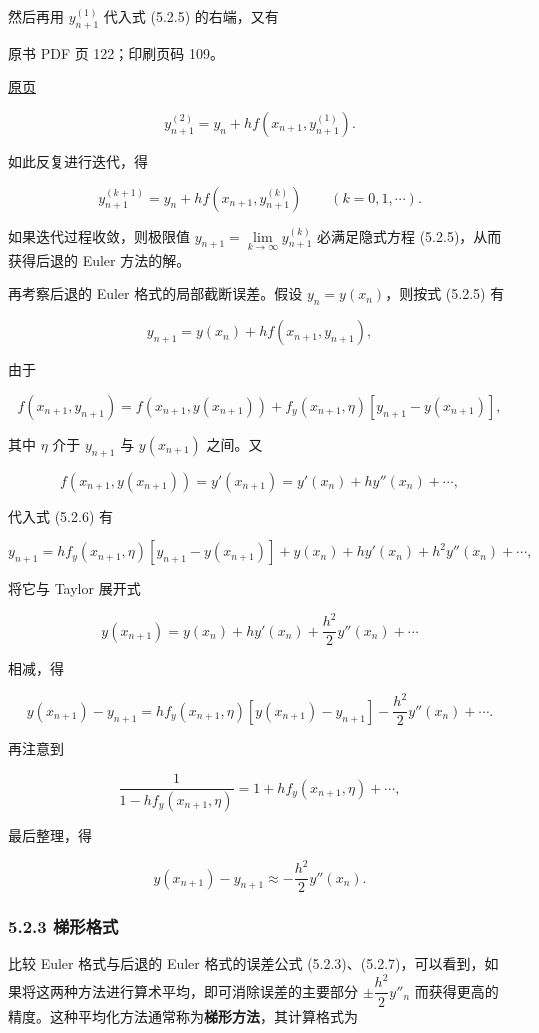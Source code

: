 然后再用 \(y_{n+1}^{(1)}\) 代入式 (5.2.5) 的右端，又有

\clearpage

原书 PDF 页 122；印刷页码 109。

\href{source-images/pdf-122.jpeg}{原页}

\[
y_{n+1}^{(2)}=y_n+hf(x_{n+1},y_{n+1}^{(1)}).
\]

如此反复进行迭代，得

\[
y_{n+1}^{(k+1)}=y_n+hf(x_{n+1},y_{n+1}^{(k)})\qquad(k=0,1,\cdots).
\]

如果迭代过程收敛，则极限值 \(y_{n+1}=\lim\limits_{k\to\infty}y_{n+1}^{(k)}\) 必满足隐式方程 (5.2.5)，从而获得后退的 Euler 方法的解。

再考察后退的 Euler 格式的局部截断误差。假设 \(y_n=y(x_n)\)，则按式 (5.2.5) 有

\[
y_{n+1}=y(x_n)+hf(x_{n+1},y_{n+1}),\tag{5.2.6}
\]

由于

\[
f(x_{n+1},y_{n+1})=f(x_{n+1},y(x_{n+1}))+f_y(x_{n+1},\eta)[y_{n+1}-y(x_{n+1})],
\]

其中 \(\eta\) 介于 \(y_{n+1}\) 与 \(y(x_{n+1})\) 之间。又

\[
f(x_{n+1},y(x_{n+1}))=y'(x_{n+1})=y'(x_n)+hy''(x_n)+\cdots,
\]

代入式 (5.2.6) 有

\[
y_{n+1}=hf_y(x_{n+1},\eta)[y_{n+1}-y(x_{n+1})]+y(x_n)+hy'(x_n)+h^2y''(x_n)+\cdots,
\]

将它与 Taylor 展开式

\[
y(x_{n+1})=y(x_n)+hy'(x_n)+\frac{h^2}{2}y''(x_n)+\cdots
\]

相减，得

\[
y(x_{n+1})-y_{n+1}=hf_y(x_{n+1},\eta)[y(x_{n+1})-y_{n+1}]-\frac{h^2}{2}y''(x_n)+\cdots.
\]

再注意到

\[
\frac{1}{1-hf_y(x_{n+1},\eta)}=1+hf_y(x_{n+1},\eta)+\cdots,
\]

最后整理，得

\[
y(x_{n+1})-y_{n+1}\approx-\frac{h^2}{2}y''(x_n).\tag{5.2.7}
\]

\subsubsection{5.2.3 梯形格式}\label{ch05a-ux68afux5f62ux683cux5f0f}

比较 Euler 格式与后退的 Euler 格式的误差公式 (5.2.3)、(5.2.7)，可以看到，如果将这两种方法进行算术平均，即可消除误差的主要部分 \(\pm\dfrac{h^2}{2}y''_n\) 而获得更高的精度。这种平均化方法通常称为\textbf{梯形方法}，其计算格式为

